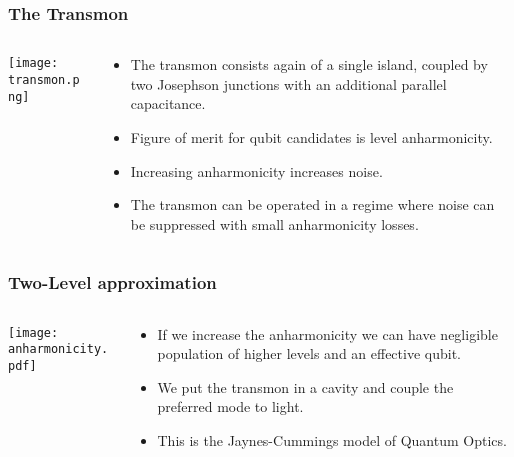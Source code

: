 \documentclass{beamer}
\begin{document}
\begin{frame}
    \frametitle{The Transmon}
    \begin{columns}[c]
        \begin{column}{0.4\linewidth}
            \begin{block}{}
                \vspace{-0.5cm}
                \texttt{[image: transmon.png]}
            \end{block}
        \end{column}
        \begin{column}{0.6\linewidth}
            \begin{itemize}
                \item The transmon consists again of a single island, 
                        coupled by two Josephson junctions with an
                        additional parallel capacitance. 
                \item Figure of merit for qubit candidates is level 
                        anharmonicity. 
                \item Increasing anharmonicity increases noise.
                \item The transmon can be operated in a regime 
                        where noise can be suppressed with small 
                        anharmonicity losses. 
            \end{itemize}
        \end{column}
    \end{columns}
\end{frame}
\begin{frame}
    \frametitle{Two-Level approximation}
    \begin{columns}[c]
        \begin{column}{0.55\linewidth}
    \texttt{[image: anharmonicity.pdf]}
        \end{column}
        \begin{column}{0.45\linewidth}
            \begin{itemize}
                \item If we increase the anharmonicity we can 
                        have negligible population of higher levels 
                        and an effective qubit.
                \item We put the transmon in a cavity and couple 
                        the preferred mode to light.
                \item This is the Jaynes-Cummings model of 
                        Quantum Optics. 
            \end{itemize}
        \end{column}
    \end{columns}
\end{frame}
\end{document}
